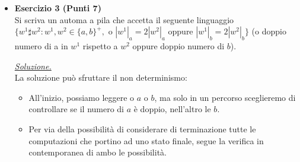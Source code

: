\documentclass[a4paper,10pt]{article}
\begin{document}
{\begin{itemize}[label=, leftmargin=0pt]
    \begin{osservazioni}
        \underline{\textit{Soluzione.}}\\
        Per risolvere l'esercizio dovremo avere sempre $N$ parentesi chiuse $)$ dopo altrettante $N$ aperte $($, perciò:
        \begin{itemize}
            \item Dovremo avere sempre all'inizio un $($, mai $)$
            \item Possiamo utilizzare l'idea di mantenere un debito, proprio come per il linguaggio delle parole con numero di a e b uguale.
        \end{itemize}
        La grammatica proposta è la seguente:\\
        
        \texttt{S -> A}\\
        \texttt{A -> () | (R | $\epsilon$} $\quad \leftarrow$ \textit{L'idea è di avere la possibilità di mantenere un debito, che potremo saldare o aumentare}\\
        \texttt{R -> )A | (RR} $\quad\quad\ \leftarrow$ \textit{Saldiamo il debito o lo incrementiamo (unitario)}  
    \end{osservazioni}

    \item \textbf{Esercizio 3 (Punti 7)}\\
    Si scriva un automa a pila che accetta il seguente linguaggio $\{w^1\sharp w^2 : w^1,w^2 \in \{a,b\}^+, \mbox{ o } |w^1|_a = 2|w^2|_a \mbox{ oppure } |w^1|_b = 2|w^2|_b\}$ (o doppio numero di a in $w^1$ rispetto a  $w^2$ oppure doppio numero di $b$).	
    
    \begin{osservazioni}
        \underline{\textit{Soluzione.}}\\
        La soluzione può sfruttare il non determinismo:
        \begin{itemize}
            \item All'inizio, possiamo leggere o $a$ o $b$, ma solo in un percorso sceglieremo di controllare se il numero di $a$ è doppio, nell'altro le $b$.
            \item Per via della possibilità di considerare di terminazione tutte le computazioni che portino ad uno stato finale, segue la verifica in contemporanea di ambo le possibilità.
        \end{itemize}


\end{osservazioni}
\end{itemize}}
\end{document}
